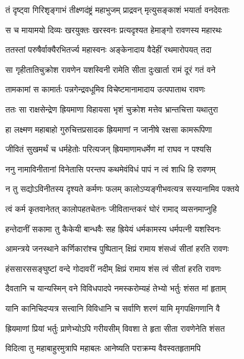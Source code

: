 \twolineshloka
{तं दृष्ट्वा गिरिशृङ्गाभं तीक्ष्णदंष्ट्रं महाभुजम्}
{प्राद्रवन् मृत्युसङ्काशं भयार्ता वनदेवताः} %

\twolineshloka
{स च मायामयो दिव्यः खरयुक्तः खरस्वनः}
{प्रत्यदृश्यत हेमाङ्गो रावणस्य महारथः} %

\twolineshloka
{ततस्तां परुषैर्वाक्यैरभितर्ज्य महास्वनः}
{अङ्केनादाय वैदेहीं रथमारोपयत् तदा} %

\twolineshloka
{सा गृहीतातिचुक्रोश रावणेन यशस्विनी}
{रामेति सीता दुःखार्ता रामं दूरं गतं वने} %

\twolineshloka
{तामकामां स कामार्तः पन्नगेन्द्रवधूमिव}
{विचेष्टमानामादाय उत्पपाताथ रावणः} %

\twolineshloka
{ततः सा राक्षसेन्द्रेण ह्रियमाणा विहायसा}
{भृशं चुक्रोश मत्तेव भ्रान्तचित्ता यथातुरा} %

\twolineshloka
{हा लक्ष्मण महाबाहो गुरुचित्तप्रसादक}
{ह्रियमाणां न जानीषे रक्षसा कामरूपिणा} %

\twolineshloka
{जीवितं सुखमर्थं च धर्महेतोः परित्यजन्}
{ह्रियमाणामधर्मेण मां राघव न पश्यसि} %

\twolineshloka
{ननु नामाविनीतानां विनेतासि परन्तप}
{कथमेवंविधं पापं न त्वं शाधि हि रावणम्} %

\twolineshloka
{न तु सद्योऽविनीतस्य दृश्यते कर्मणः फलम्}
{कालोऽप्यङ्गीभवत्यत्र सस्यानामिव पक्तये} %

\twolineshloka
{त्वं कर्म कृतवानेतत् कालोपहतचेतनः}
{जीवितान्तकरं घोरं रामाद् व्यसनमाप्नुहि} %

\twolineshloka
{हन्तेदानीं सकामा तु कैकेयी बान्धवैः सह}
{ह्रियेयं धर्मकामस्य धर्मपत्नी यशस्विनः} %

\twolineshloka
{आमन्त्रये जनस्थाने कर्णिकारांश्च पुष्पितान्}
{क्षिप्रं रामाय शंसध्वं सीतां हरति रावणः} %

\twolineshloka
{हंससारससङ्घुष्टां वन्दे गोदावरीं नदीम्}
{क्षिप्रं रामाय शंस त्वं सीतां हरति रावणः} %

\twolineshloka
{दैवतानि च यान्यस्मिन् वने विविधपादपे}
{नमस्करोम्यहं तेभ्यो भर्तुः शंसत मां हृताम्} %

\twolineshloka
{यानि कानिचिदप्यत्र सत्त्वानि विविधानि च}
{सर्वाणि शरणं यामि मृगपक्षिगणानि वै} %

\twolineshloka
{ह्रियमाणां प्रियां भर्तुः प्राणेभ्योऽपि गरीयसीम्}
{विवशा ते हृता सीता रावणेनेति शंसत} %

\twolineshloka
{विदित्वा तु महाबाहुरमुत्रापि महाबलः}
{आनेष्यति पराक्रम्य वैवस्वतहृतामपि} %

